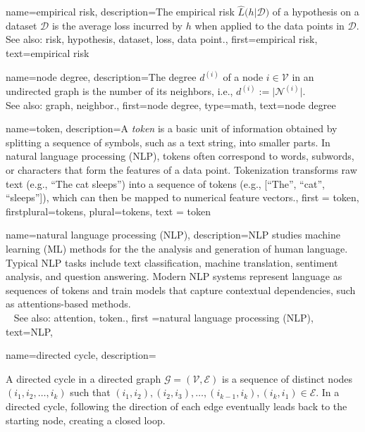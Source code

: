 {
{name={empirical risk},
  description={The empirical risk $\widehat{L}\big(h|\mathcal{D}\big)$ 
  	of a hypothesis on a dataset $\mathcal{D}$ is the average loss incurred 
  	by $h$ when applied to the data points in $\mathcal{D}$.
				\\ 
		See also: risk, hypothesis, dataset, loss, data point.},
  first={empirical risk},
  text={empirical risk} 
}

{name={node degree},
	description={The degree $d^{(i)}$ of a 
	node $i \in \mathcal{V}$ in an undirected graph is the 
	number of its neighbors, i.e., $d^{(i)} := \big|\mathcal{N}^{(i)}\big|$.
					\\ 
		See also: graph, neighbor.},
	first={node degree},
	type=math, 
	text={node degree} 
}

{name={token},
 description={A \textit{token} is a basic unit of information 
  obtained by splitting a sequence of symbols, such as a text string, 
  into smaller parts. In natural language processing (NLP), tokens often correspond to words, subwords, 
  or characters that form the features of a data point. 
  Tokenization transforms raw text (e.g., ``The cat sleeps'') into a 
  sequence of tokens (e.g., [``The'', ``cat'', ``sleeps'']), which can
  then be mapped to numerical feature vectors.}, 
  first = {token}, 
  firstplural={tokens}, 
  plural={tokens}, 
  text = {token}
}

{name={natural language processing (NLP)},
 description={NLP  
 studies machine learning (ML) methods for the the analysis and generation of human language. 
  Typical NLP tasks include text classification, machine translation, 
  sentiment analysis, and question answering. Modern NLP systems represent 
  language as sequences of tokens and train models that 
  capture contextual dependencies, such as attentions-based methods.\\ 
  See also: attention, token.}, 
first ={natural language processing (NLP)}, 
text={NLP},
}

{name={directed cycle},
	description={A directed cycle in a directed graph $\mathcal{G}=\left( \mathcal{V},\mathcal{E} \right)$ 
	is a sequence of distinct nodes $(i_1, i_2, \ldots, i_k)$ 
	such that $(i_1, i_2), (i_2, i_3), \ldots, (i_{k-1}, i_k), 
     (i_k, i_1) \in \mathcal{E}$. In a directed cycle, following the direction 
	 of each edge eventually leads back to the starting node, creating a closed loop. 
	 \begin{figure}[H]
	\centering
	\begin{tikzpicture}[>=Latex, node distance=1.4cm, thick]
	

\end{tikzpicture}
\end{figure}}}}
